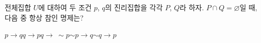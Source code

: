 전체집합 $U$에 대하여 두 조건 $p$, $q$의 진리집합을 각각 $P$, $Q$라 하자. $P\cap Q=\varnothing$일 때, 다음 중 항상 참인 명제는?
\begin{choices32}{$p\longrightarrow q$}{$q\longrightarrow p$}{$q\longrightarrow\ \sim p$}{$\sim p\longrightarrow q$}{$\sim q\longrightarrow p$}\end{choices32}
